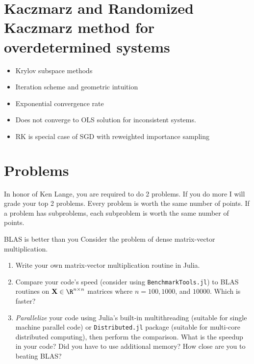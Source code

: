 \documentclass[./some_latex_template.tex]{subfiles}
\begin{document}
\section{Kaczmarz and Randomized Kaczmarz method for overdetermined systems}

\begin{itemize}
	\item Krylov subspace methods
	\item Iteration scheme and geometric intuition
	\item Exponential convergence rate
	\item Does not converge to OLS solution for inconsistent systems.
	\item RK is special case of SGD with reweighted importance sampling
\end{itemize}

\section{Problems}
In honor of Ken Lange, you are required to do 2 problems. If you do more I will grade your top 2 problems. Every problem is worth the same number of points. If a problem has subproblems, each subproblem is worth the same number of points.

\begin{problembox}{{BLAS is better than you}}{}
Consider the problem of dense matrix-vector multiplication. 
\begin{enumerate}
	\item Write your own matrix-vector multiplication routine in Julia.
	\item Compare your code's speed (consider using \texttt{BenchmarkTools.jl}) to BLAS routines on $\bX \in \R^{n \times n}$ matrices where $n = 100, 1000$, and $10000$. Which is faster?
	\item \textit{Parallelize} your code using Julia's built-in multithreading (suitable for single machine parallel code) or \texttt{Distributed.jl} package (suitable for multi-core distributed computing), then perform the comparison. What is the speedup in your code? Did you have to use additional memory? How close are you to beating BLAS?
\end{enumerate}
\end{problembox}
\end{document}
